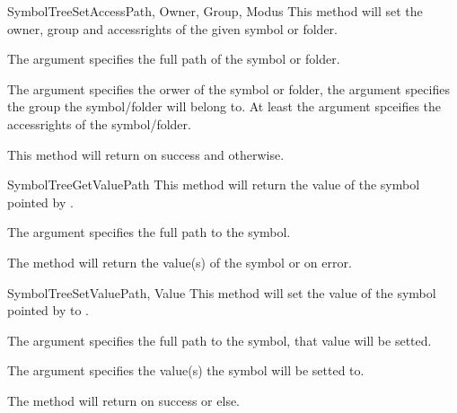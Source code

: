 \begin{methoddesc}[Core]{SymbolTreeSetAccess}{Path, Owner, Group, Modus}
This method will set the owner, group and accessrights of the given symbol or folder.

The argument  specifies the full path of the symbol or folder.

The argument  specifies the orwer of the symbol or folder, the 
argument  specifies the group the symbol/folder will belong to.
At least the argument  spceifies the accessrights of the
symbol/folder.

This method will return  on success and  otherwise.
\end{methoddesc}


\begin{methoddesc}[Core]{SymbolTreeGetValue}{Path}
This method will return the value of the symbol pointed by .

The argument  specifies the full path to the symbol. 

The method will return the value(s) of the symbol or  on error.
\end{methoddesc}


\begin{methoddesc}[Core]{SymbolTreeSetValue}{Path, Value}
This method will set the value of the symbol pointed by  to .

The argument  specifies the full path to the symbol, that value will be setted.

The argument  specifies the value(s) the symbol will be setted to.

The method will return  on success or  else.
\end{methoddesc}


